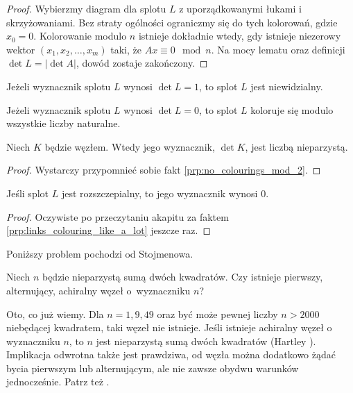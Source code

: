\begin{proof}
    Wybierzmy diagram dla splotu $L$ z uporządkowanymi łukami i skrzyżowaniami.
    Bez straty ogólności ograniczmy się do tych kolorowań, gdzie $x_0 = 0$.
    Kolorowanie modulo $n$ istnieje dokładnie wtedy, gdy istnieje niezerowy wektor $(x_1, x_2, \ldots, x_m)$ taki, że $Ax \equiv 0 \mod n$.
    Na mocy lematu oraz definicji $\det L = |\det A|$, dowód zostaje zakończony.
\end{proof}

\begin{corollary}
%
    Jeżeli wyznacznik splotu $L$ wynosi $\det L = 1$, to splot $L$ jest niewidzialny.
\end{corollary}

\begin{corollary}
    Jeżeli wyznacznik splotu $L$ wynosi $\det L = 0$, to splot $L$ koloruje się modulo wszystkie liczby naturalne.
\end{corollary}

\begin{corollary}
    \label{cor:knot_determinant_odd}%
    Niech $K$ będzie węzłem.
    Wtedy jego wyznacznik, $\det K$, jest liczbą nieparzystą.
\end{corollary}

\begin{proof}
    Wystarczy przypomnieć sobie fakt \ref{prp:no_colourings_mod_2}.
\end{proof}

\begin{corollary}
        Jeśli splot $L$ jest rozszczepialny, to jego wyznacznik wynosi $0$.
    \end{corollary}
    
    \begin{proof}
        Oczywiste po przeczytaniu akapitu za faktem \ref{prp:links_colouring_like_a_lot} jeszcze raz.
    \end{proof}

Poniższy problem pochodzi od Stojmenowa.
%

\begin{conjecture}
    Niech $n$ będzie nieparzystą sumą dwóch kwadratów.
    Czy istnieje pierwszy, alternujący, achiralny węzeł o~wyznaczniku $n$?
\end{conjecture}

Oto, co już wiemy.
Dla $n = 1, 9, 49$ oraz być może pewnej liczby $n > 2000$ niebędącej kwadratem, taki węzeł nie istnieje.
Jeśli istnieje achiralny węzeł o wyznaczniku $n$, to $n$ jest nieparzystą sumą dwóch kwadratów (Hartley \cite{hartley1979}).
%
Implikacja odwrotna także jest prawdziwa, od węzła można dodatkowo żądać bycia pierwszym lub alternującym, ale nie zawsze obydwu warunków jednocześnie.
Patrz też \cite{stoimenow2005}.
%


